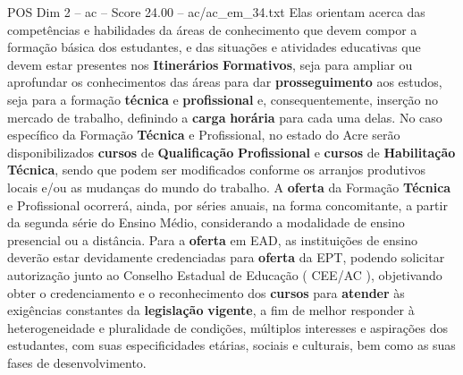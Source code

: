 \begin{textsample}{POS Dim 2 – ac – Score 24.00 – ac/ac\_em\_34.txt}
Elas orientam acerca das competências e habilidades da áreas de conhecimento que devem compor a formação básica dos estudantes, e das situações e atividades educativas que devem estar presentes nos \textbf{Itinerários} \textbf{Formativos}, seja para ampliar ou aprofundar os conhecimentos das áreas para dar \textbf{prosseguimento} aos estudos, seja para a formação \textbf{técnica} e \textbf{profissional} e, consequentemente, inserção no mercado de trabalho, definindo a \textbf{carga} \textbf{horária} para cada uma delas.
No caso específico da Formação \textbf{Técnica} e Profissional, no estado do Acre serão disponibilizados \textbf{cursos} de \textbf{Qualificação} \textbf{Profissional} e \textbf{cursos} de \textbf{Habilitação} \textbf{Técnica}, sendo que podem ser modificados conforme os arranjos produtivos locais e/ou as mudanças do mundo do trabalho.
A \textbf{oferta} da Formação \textbf{Técnica} e Profissional ocorrerá, ainda, por séries anuais, na forma concomitante, a partir da segunda série do Ensino Médio, considerando a modalidade de ensino presencial ou a distância.
Para a \textbf{oferta} em EAD, as instituições de ensino deverão estar devidamente credenciadas para \textbf{oferta} da EPT, podendo solicitar autorização junto ao Conselho Estadual de Educação ( CEE/AC ), objetivando obter o credenciamento e o reconhecimento dos \textbf{cursos} para \textbf{atender} às exigências constantes da \textbf{legislação} \textbf{vigente}, a fim de melhor responder à heterogeneidade e pluralidade de condições, múltiplos interesses e aspirações dos estudantes, com suas especificidades etárias, sociais e culturais, bem como as suas fases de desenvolvimento.

\end{textsample}
